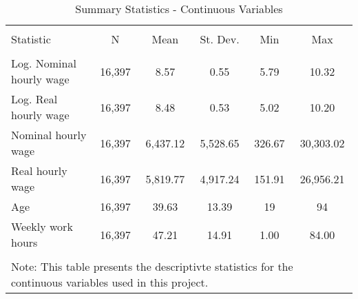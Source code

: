 
\begin{table}[!htbp] \centering 
  \caption{Summary Statistics - Continuous Variables} 
  \label{} 
\begin{tabular}{@{\extracolsep{5pt}}lccccc} 
\\[-1.8ex]\hline 
\hline \\[-1.8ex] 
Statistic & \multicolumn{1}{c}{N} & \multicolumn{1}{c}{Mean} & \multicolumn{1}{c}{St. Dev.} & \multicolumn{1}{c}{Min} & \multicolumn{1}{c}{Max} \\ 
\hline \\[-1.8ex] 
Log. Nominal hourly wage & 16,397 & 8.57 & 0.55 & 5.79 & 10.32 \\ 
Log. Real hourly wage & 16,397 & 8.48 & 0.53 & 5.02 & 10.20 \\ 
Nominal hourly wage & 16,397 & 6,437.12 & 5,528.65 & 326.67 & 30,303.02 \\ 
Real hourly wage & 16,397 & 5,819.77 & 4,917.24 & 151.91 & 26,956.21 \\ 
Age & 16,397 & 39.63 & 13.39 & 19 & 94 \\ 
Weekly work hours & 16,397 & 47.21 & 14.91 & 1.00 & 84.00 \\ 
\hline \\[-1.8ex] 
\multicolumn{6}{l}{Note: This table presents the descriptivte statistics for the continuous variables used in this project.} \\ 
\end{tabular} 
\end{table} 
